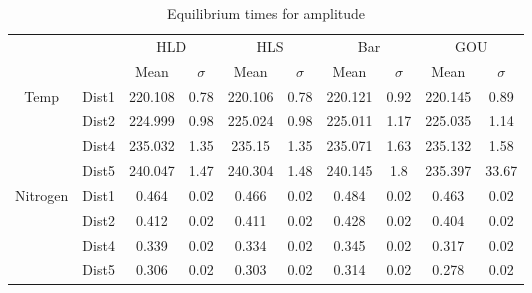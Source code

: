 \begin{table}[h]
\centering
\caption{Equilibrium times for amplitude}
\label{table:5}
\begin{tabular}{cccccccccc}
\toprule
 &  & \multicolumn{2}{c}{HLD} & \multicolumn{2}{c}{HLS} & \multicolumn{2}{c}{Bar} & \multicolumn{2}{c}{GOU} \\
 &  & Mean & $\sigma$ & Mean & $\sigma$ & Mean & $\sigma$ & Mean & $\sigma$ \\
\midrule
\multirow[c]{4}{*}{Temp} & Dist1 & 220.108 & 0.78 & 220.106 & 0.78 & 220.121 & 0.92 & 220.145 & 0.89 \\
 & Dist2 & 224.999 & 0.98 & 225.024 & 0.98 & 225.011 & 1.17 & 225.035 & 1.14 \\
 & Dist4 & 235.032 & 1.35 & 235.15 & 1.35 & 235.071 & 1.63 & 235.132 & 1.58 \\
 & Dist5 & 240.047 & 1.47 & 240.304 & 1.48 & 240.145 & 1.8 & 235.397 & 33.67 \\
\multirow[c]{4}{*}{Nitrogen} & Dist1 & 0.464 & 0.02 & 0.466 & 0.02 & 0.484 & 0.02 & 0.463 & 0.02 \\
 & Dist2 & 0.412 & 0.02 & 0.411 & 0.02 & 0.428 & 0.02 & 0.404 & 0.02 \\
 & Dist4 & 0.339 & 0.02 & 0.334 & 0.02 & 0.345 & 0.02 & 0.317 & 0.02 \\
 & Dist5 & 0.306 & 0.02 & 0.303 & 0.02 & 0.314 & 0.02 & 0.278 & 0.02 \\
\bottomrule
\end{tabular}
\end{table}
